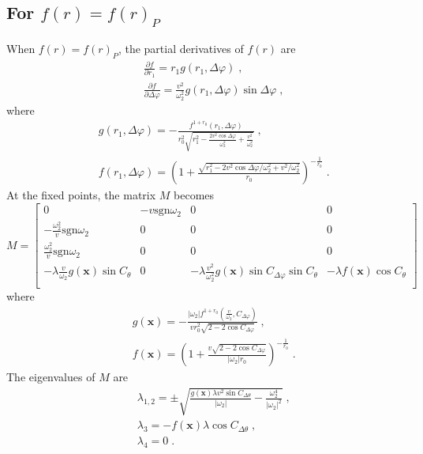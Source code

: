 \documentclass{article}
\begin{document}
\subsection{For $f\left( r \right) = f\left( r \right) _P$}

When $f\left( r \right) = f\left( r \right) _P$, the partial derivatives of $f\left( r \right)$ are
\begin{eqnarray}
    &&\frac{\partial f}{\partial r_1}=r_1g\left( r_1,\Delta \varphi \right)\;,
    \\
    &&\frac{\partial f}{\partial \Delta \varphi}=\frac{v^2}{\omega _{2}^{2}}g\left( r_1,\Delta \varphi \right) \sin \Delta \varphi\;,
\end{eqnarray}
where
\begin{eqnarray}
    &&g\left( r_1,\Delta \varphi \right) =-\frac{f^{1+r_0}\left( r_1,\Delta \varphi \right)}{r_{0}^{2}\sqrt{r_{1}^{2}-\frac{2v^2\cos \Delta \varphi}{\omega _{2}^{2}}+\frac{v^2}{\omega _{2}^{2}}}}\;,
    \\
    &&f\left( r_1,\Delta \varphi \right) =\left( 1+\frac{\sqrt{r_{1}^{2}-2v^2\cos \Delta \varphi /\omega _{2}^{2}+v^2/\omega _{2}^{2}}}{r_0} \right) ^{-\frac{1}{r_0}}\;.
\end{eqnarray}
At the fixed points, the matrix $M$ becomes
\begin{equation}
    M=\left[ \begin{matrix}
        0&		-v\text{sgn} \omega _2&		0&		0\\
        -\frac{\omega _{2}^{2}}{v}\text{sgn} \omega _2&		0&		0&		0\\
        \frac{\omega _{2}^{2}}{v}\text{sgn} \omega _2&		0&		0&		0\\
        -\lambda \frac{v}{\omega _2}g\left( \mathbf{x} \right) \sin C_{\theta}&		0&		-\lambda \frac{v^2}{\omega _{2}^{2}}g\left( \mathbf{x} \right) \sin C_{\Delta \varphi}\sin C_{\theta}&		-\lambda f\left( \mathbf{x} \right) \cos C_{\theta}\\
    \end{matrix} \right] 
\end{equation}
where
\begin{eqnarray}
    &&g\left( \mathbf{x} \right) =-\frac{\left| \omega _2 \right|f^{1+r_0}\left( \frac{v}{\omega _2},C_{\Delta \varphi} \right)}{vr_{0}^{2}\sqrt{2-2\cos C_{\Delta \varphi}}}\;,\\
    &&f\left( \mathbf{x} \right) =\left( 1+\frac{v\sqrt{2-2\cos C_{\Delta \varphi}}}{\left| \omega _2 \right|r_0} \right) ^{-\frac{1}{r_0}}\;.
\end{eqnarray}
The eigenvalues of $M$ are
\begin{eqnarray}
    &&\lambda _{1,2}=\pm \sqrt{\frac{g\left( \mathbf{x} \right)\lambda v^2\sin C_{\Delta \theta}}{\left| \omega _2 \right|}-\frac{\omega _{2}^{4}}{\left| \omega _2 \right|^2}}\;,
    \\
    &&\lambda _3=-f\left( \mathbf{x} \right)\lambda \cos C_{\Delta \theta}\;,
    \\
    &&\lambda _4=0\;.
\end{eqnarray}
\end{document}
